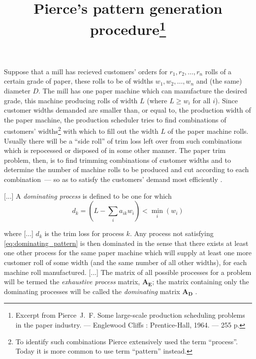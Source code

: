 \documentclass[12pt]{article}
\title{Pierce's pattern generation procedure\thanks{Excerpt from Pierce~J.~F. 
Some large-scale production scheduling problems in the paper industry. 
--- Englewood Cliffs : Prentice-Hall, 1964. --- 255 p.}}
\date{}
\begin{document}
\maketitle

Suppose that a mill has recieved customers' orders for $r_1, r_2, \ldots, r_n$
rolls of a certain grade of paper, these rolls to be of widths
$w_1, w_2, \ldots, w_n$ and (the same) diameter $D$. The mill has one paper 
machine which can manufacture the desired grade, this machine producing rolls
of width $L$ (where $L \geq w_i$ for all $i$). Since customer widths demanded 
are smaller than, or equal to, the production width of the paper machine, the
production scheduler tries to find combinations of customers' 
widths\footnote{To identify such combinations Pierce extensively used the term 
``process''. Today it is more common to use term ``pattern'' instead.} with 
which to fill out the width $L$ of the paper machine rolls. Usually there will 
be a ``side roll'' of trim loss left over from such combinations which is 
repocessed or disposed of in some other manner. The paper trim problem, then, 
is to find trimming combinations of customer widths and to determine the number 
of machine rolls to be produced and cut according to each combination~--- so as 
to satisfy the customers' demand most efficiently \cite[p.~13]{bib:pierce64}.

[...] A \textit{dominating process} is defined to be one for which
\begin{equation}\label{eq:dominating_pattern}
 d_k=\left( L - \sum_{i}a_{ik}w_i\right)<\min_{i}(w_i) 
\end{equation}

where [...] $d_k$ is the trim loss for process $k$. Any process not 
satisfying \eqref{eq:dominating_pattern} is then dominated in the sense that
there exists at least one other process for the same paper machine which will
supply at least one more customer roll of some width (and the same number of 
all other widths), for each machine roll manufactured. [...] The matrix of all
possible processes for a problem will be termed the \textit{exhaustive process}
matrix, $\bm{A_E}$; the matrix containing  only the dominating processes will
be called the \textit{dominating} matrix $\bm{A_D}$ \cite[p.~18]{bib:pierce64}.
\end{document}
